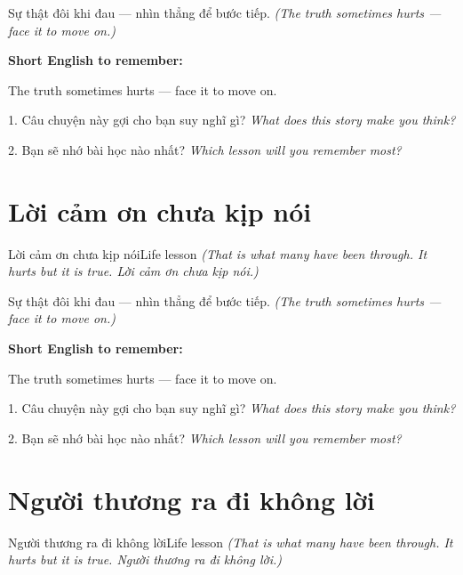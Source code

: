\begin{baihoc}
Sự thật đôi khi đau — nhìn thẳng để bước tiếp.
\textit{(The truth sometimes hurts — face it to move on.)}
\end{baihoc}

\begin{ghinhoanh}
\textbf{Short English to remember:}

The truth sometimes hurts — face it to move on.

\end{ghinhoanh}

\begin{tuhocnhanh}
1. Câu chuyện này gợi cho bạn suy nghĩ gì? \textit{What does this story make you think?}

2. Bạn sẽ nhớ bài học nào nhất? \textit{Which lesson will you remember most?}
\end{tuhocnhanh}
\ngancach


\section{Lời cảm ơn chưa kịp nói}
\begin{truyen}{Lời cảm ơn chưa kịp nói}{Life lesson}
\textit{(That is what many have been through. It hurts but it is true. Lời cảm ơn chưa kịp nói.)}
\end{truyen}

\begin{baihoc}
Sự thật đôi khi đau — nhìn thẳng để bước tiếp.
\textit{(The truth sometimes hurts — face it to move on.)}
\end{baihoc}

\begin{ghinhoanh}
\textbf{Short English to remember:}

The truth sometimes hurts — face it to move on.

\end{ghinhoanh}

\begin{tuhocnhanh}
1. Câu chuyện này gợi cho bạn suy nghĩ gì? \textit{What does this story make you think?}

2. Bạn sẽ nhớ bài học nào nhất? \textit{Which lesson will you remember most?}
\end{tuhocnhanh}
\ngancach


\section{Người thương ra đi không lời}
\begin{truyen}{Người thương ra đi không lời}{Life lesson}
\textit{(That is what many have been through. It hurts but it is true. Người thương ra đi không lời.)}
\end{truyen}

